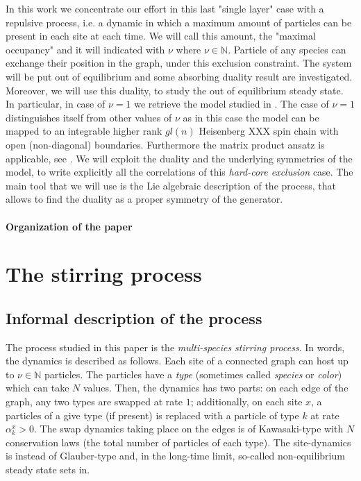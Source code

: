 \documentclass[11pt]{article}
\numberwithin{equation}{section}
\numberwithin{equation}{subsection}
\newcommand{\twoj}{\nu}
\begin{document}
In this work we concentrate our effort in this last "single layer" case with a repulsive process, i.e. a dynamic in which a maximum amount of particles can be present in each site at each time. We will call this amount, the "maximal occupancy" and it will indicated with $\twoj$ where $\twoj\in\mathbb{N}$. Particle of any species can exchange their position in the graph, under this exclusion constraint. The system will be put out of equilibrium and some absorbing duality result are investigated. Moreover, we will use this duality, to study the out of equilibrium steady state. In particular, in case of $\twoj=1$ we retrieve the model studied in \cite{vanicat2017exact}. 
{\color{red}
The case of $\twoj=1$ distinguishes itself from other values of $\twoj$ as in this case the model can be mapped to an integrable higher rank $gl(n)$ Heisenberg XXX spin chain with open (non-diagonal) boundaries. Furthermore the matrix product ansatz \cite{derrida1993exact}  is applicable, see \cite{Crampe:2014aoa,vanicat2017exact}.
}
We will exploit the duality and the underlying symmetries of the model, to write explicitly all the correlations of this \textit{hard-core exclusion} case. The main tool that we will use is the Lie algebraic description of the process, that allows to find the duality as a proper symmetry of the generator. 
\paragraph{Organization of the paper}
\section{The stirring process}
\subsection{Informal description of the process}
The process studied in this paper is the {\em multi-species stirring process}. 
In words, the dynamics is described as follows. Each site
of a connected graph can host up to $\nu\in \mathbb{N}$ particles.
The particles have a {\em type} (sometimes called {\em species} or {\em color})
which can take $N$ values.
Then, the dynamics has two parts: on each edge of the graph, 
any two types are swapped at rate $1$; additionally, on each site $x$, 
a particles of a give type (if present) is replaced with a
particle of type $k$ at rate $\alpha_k^x >0$.
The swap dynamics taking place on the edges is of Kawasaki-type 
with $N$ conservation laws
(the total number of particles of each type). 
The site-dynamics is instead of Glauber-type 
and, in the long-time limit, so-called non-equilibrium
steady state sets in.
\end{document}
